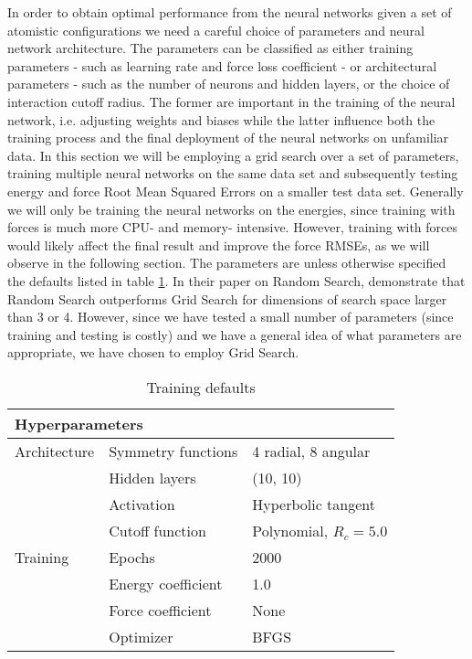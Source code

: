 In order to obtain optimal performance from the neural networks
given a set of atomistic configurations we need a careful choice of parameters
and neural network architecture. The parameters can be classified as either
training parameters - such as learning rate and force loss coefficient -
or architectural parameters - such as the number of neurons and hidden layers,
or the choice of interaction cutoff radius. The former are important
in the training of the neural network, i.e. adjusting weights and biases
while the latter influence both the training process and the final
deployment of the neural networks on unfamiliar data.
In this section we will be employing a grid search over a set of
parameters, training multiple neural networks on the same data set
and subsequently testing energy and force Root Mean Squared Errors on
a smaller test data set. Generally we will only be training the neural networks
on the energies, since training with forces is much more CPU- and memory-
intensive. However, training with forces would likely affect the final
result and improve the force RMSEs, as we will observe in the following section.
The parameters are unless otherwise specified the defaults listed
in table \ref{table:defaults}.
In their paper on Random Search, \parencite[Bergstra and Bengio]{
    bergstra2012random}
demonstrate that Random Search outperforms Grid Search for dimensions
of search space larger than 3 or 4. However, since we have tested
a small number of parameters (since training and testing is costly)
and we have a general idea of what parameters are appropriate, we
have chosen to employ Grid Search.

\begin{table}[h]
\begin{tabular}{@{}lll@{}}
\toprule
\multicolumn{3}{l}{Hyperparameters}                                    \\ \midrule
Architecture & Symmetry functions & 4 radial, 8 angular                \\
             & Hidden layers      & (10, 10)                           \\
             & Activation         & Hyperbolic tangent                 \\
             & Cutoff function    & Polynomial, $R_c = 5.0$            \\
Training     & Epochs             & 2000                               \\
             & Energy coefficient & 1.0                                \\
             & Force coefficient  & None                                \\
             & Optimizer          & BFGS                               \\ \bottomrule
\end{tabular}
\caption{Training defaults}
\label{table:defaults}
\end{table}

